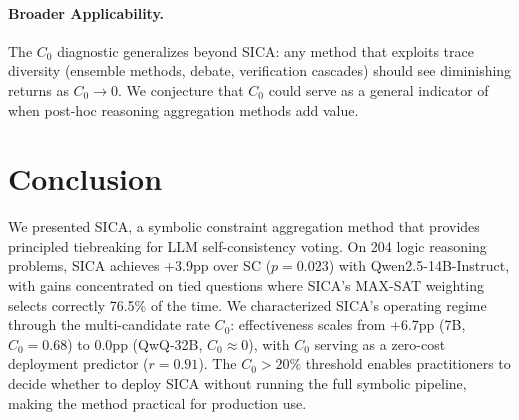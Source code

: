 \documentclass[11pt,a4paper]{article}
\begin{document}
\paragraph{Broader Applicability.}
The $C_0$ diagnostic generalizes beyond SICA: any method that exploits trace diversity (ensemble methods, debate, verification cascades) should see diminishing returns as $C_0 \to 0$. We conjecture that $C_0$ could serve as a general indicator of when post-hoc reasoning aggregation methods add value.

\section{Conclusion}

We presented SICA, a symbolic constraint aggregation method that provides principled tiebreaking for LLM self-consistency voting. On 204 logic reasoning problems, SICA achieves +3.9pp over SC ($p=0.023$) with Qwen2.5-14B-Instruct, with gains concentrated on tied questions where SICA's MAX-SAT weighting selects correctly 76.5\% of the time. We characterized SICA's operating regime through the multi-candidate rate $C_0$: effectiveness scales from +6.7pp (7B, $C_0=0.68$) to 0.0pp (QwQ-32B, $C_0 \approx 0$), with $C_0$ serving as a zero-cost deployment predictor ($r=0.91$). The $C_0 > 20\%$ threshold enables practitioners to decide whether to deploy SICA without running the full symbolic pipeline, making the method practical for production use.
\end{document}
